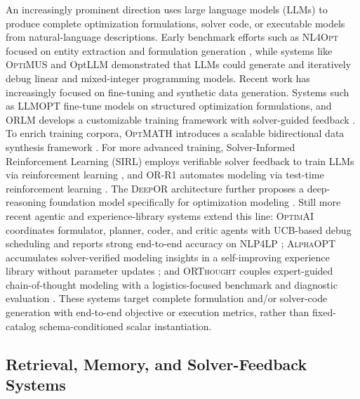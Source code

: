 \documentclass[pdflatex,sn-basic,Numbered]{sn-jnl}
\begin{document}
An increasingly prominent direction uses large language models (LLMs) to produce complete optimization formulations, solver code, or executable models from natural-language descriptions. Early benchmark efforts such as \textsc{NL4Opt} focused on entity extraction and formulation generation \cite{ramamonjison2023nl4opt}, while systems like \textsc{OptiMUS} \cite{ahmaditeshnizi2024optimus_icml} and OptLLM \cite{zhang2024optllm} demonstrated that LLMs could generate and iteratively debug linear and mixed-integer programming models. Recent work has increasingly focused on fine-tuning and synthetic data generation. Systems such as \textsc{LLMOPT} \cite{jiang2025llmopt} fine-tune models on structured optimization formulations, and \textsc{ORLM} develops a customizable training framework with solver-guided feedback \cite{huang2025orlm}. To enrich training corpora, \textsc{OptMATH} introduces a scalable bidirectional data synthesis framework \cite{lu2025optmath}. For more advanced training, Solver-Informed Reinforcement Learning (SIRL) employs verifiable solver feedback to train LLMs via reinforcement learning \cite{chen2025solver}, and \textsc{OR-R1} automates modeling via test-time reinforcement learning \cite{ding2026orr1}. The \textsc{DeepOR} architecture further proposes a deep-reasoning foundation model specifically for optimization modeling \cite{xiao2026deepor}. Still more recent agentic and experience-library systems extend this line: \textsc{OptimAI} coordinates formulator, planner, coder, and critic agents with UCB-based debug scheduling and reports strong end-to-end accuracy on \textsc{NLP4LP} \cite{thind2025optimai}; \textsc{AlphaOPT} accumulates solver-verified modeling insights in a self-improving experience library without parameter updates \cite{kong2025alphaopt}; and \textsc{ORThought} couples expert-guided chain-of-thought modeling with a logistics-focused benchmark and diagnostic evaluation \cite{yang2026orthought}. These systems target complete formulation and/or solver-code generation with end-to-end objective or execution metrics, rather than fixed-catalog schema-conditioned scalar instantiation.

\subsection{Retrieval, Memory, and Solver-Feedback Systems}
\label{subsec:rw_retrieval_memory}
\end{document}
